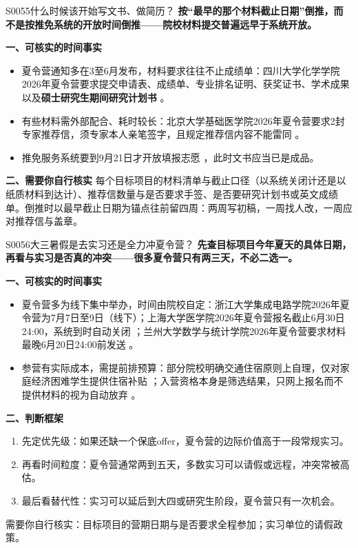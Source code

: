 \begin{qa}{S0055}{什么时候该开始写文书、做简历？}
\textbf{按“最早的那个材料截止日期”倒推，而不是按推免系统的开放时间倒推——院校材料提交普遍远早于系统开放。}

\textbf{一、可核实的时间事实}
\begin{itemize}
  \item 夏令营通知多在3至6月发布，材料要求往往不止成绩单：四川大学化学学院2026年夏令营要求提交申请表、成绩单、专业排名证明、获奖证书、学术成果以及\textbf{硕士研究生期间研究计划书} 。
  \item 有些材料需外部配合、耗时较长：北京大学基础医学院2026年夏令营要求2封专家推荐信，须专家本人亲笔签字，且规定推荐信内容不能雷同 。
  \item 推免服务系统要到9月21日才开放填报志愿 ，此时文书应当已是成品。
\end{itemize}

\textbf{二、需要你自行核实}
每个目标项目的材料清单与截止口径（以系统关闭计还是以纸质材料到达计）、推荐信数量与是否要求手签、是否要研究计划书或英文成绩单。倒推时以最早截止日期为锚点往前留四周：两周写初稿，一周找人改，一周应对推荐信与盖章。
\end{qa}

\begin{qa}{S0056}{大三暑假是去实习还是全力冲夏令营？}
\textbf{先查目标项目今年夏天的具体日期，再看与实习是否真的冲突——很多夏令营只有两三天，不必二选一。}

\textbf{一、可核实的时间事实}
\begin{itemize}
  \item 夏令营多为线下集中举办，时间由院校自定：浙江大学集成电路学院2026年夏令营为7月7日至9日（线下）；上海大学医学院2026年夏令营报名截止6月30日24:00，系统到时自动关闭 ；兰州大学数学与统计学院2026年夏令营要求材料最晚6月20日24:00前发送 。
  \item 参营有实际成本，需提前排预算：部分院校明确交通住宿原则上自理，仅对家庭经济困难学生提供住宿补贴 ；入营资格本身是筛选结果，只网上报名而不提供材料的视为自动放弃 。
\end{itemize}

\textbf{二、判断框架}
\begin{enumerate}
  \item 先定优先级：如果还缺一个保底offer，夏令营的边际价值高于一段常规实习。
  \item 再看时间粒度：夏令营通常两到五天，多数实习可以请假或远程，冲突常被高估。
  \item 最后看替代性：实习可以延后到大四或研究生阶段，夏令营只有一次机会。
\end{enumerate}

需要你自行核实：目标项目的营期日期与是否要求全程参加；实习单位的请假政策。
\end{qa}

